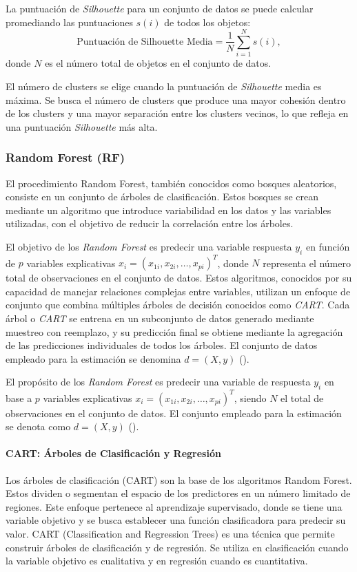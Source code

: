La puntuación de \textit{Silhouette} para un conjunto de datos se puede calcular promediando las puntuaciones $s(i)$ de todos los objetos:
\[ \text{Puntuación de Silhouette Media} = \frac{1}{N} \sum_{i=1}^{N} s(i), \]
donde \(N\) es el número total de objetos en el conjunto de datos.

El número de clusters se elige cuando la puntuación de \textit{Silhouette} media es máxima. Se busca el número de clusters que produce una mayor cohesión dentro de los clusters y una mayor
separación entre los clusters vecinos, lo que refleja en una puntuación \textit{Silhouette} más alta.


\subsubsection{Random Forest (RF)}\label{sec:rf}

El procedimiento Random Forest, también conocidos como bosques aleatorios, consiste en un conjunto de árboles de clasificación. Estos bosques se crean mediante un algoritmo que introduce variabilidad en los datos y las variables utilizadas, con el objetivo de reducir la correlación entre los árboles.


El objetivo de los \textit{Random Forest} es predecir una variable respuesta \(y_i\) en función de \(p\) variables explicativas \(x_i = (x_{1i}, x_{2i}, \ldots, x_{pi})^T\), donde \(N\) representa el número total de observaciones en el conjunto de datos. Estos algoritmos, conocidos por su capacidad de manejar relaciones complejas entre variables, utilizan un enfoque de conjunto que combina múltiples árboles de decisión conocidos como \textit{CART}. Cada árbol o \textit{CART} se entrena en un subconjunto de datos generado mediante muestreo con reemplazo, y su predicción final se obtiene mediante la agregación de las predicciones individuales de todos los árboles. El conjunto de datos empleado para la estimación se denomina \(d = (X, y)\) (\cite{ho1995random}).


El propósito de los \textit{Random Forest} es predecir una variable de respuesta \(y_i\) en base a \(p\) variables explicativas \(x_i = (x_{1i}, x_{2i}, \ldots, x_{pi})^T\), siendo \(N\) el total de observaciones en el conjunto de datos. El conjunto empleado para la estimación se denota como \(d = (X, y)\) (\cite{ho1995random}).



\paragraph{CART: Árboles de Clasificación y Regresión}
Los árboles de clasificación (CART) son la base de los algoritmos Random Forest. Estos dividen o segmentan el espacio de los predictores en un número limitado de regiones. Este enfoque pertenece al aprendizaje supervisado, donde se tiene una variable objetivo y se busca establecer una función clasificadora para predecir su valor. CART (Classification and Regression Trees) es una técnica que permite construir árboles de clasificación y de regresión. Se utiliza en clasificación cuando la variable objetivo es cualitativa y en regresión cuando es cuantitativa.

